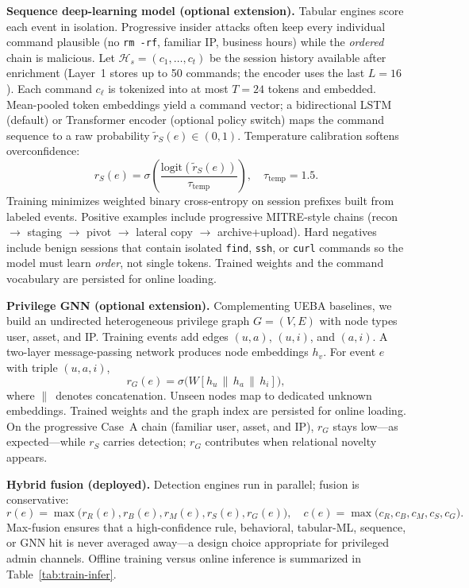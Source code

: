 \documentclass{ieeeaccess}
\begin{document}
\textbf{Sequence deep-learning model (optional extension).}
Tabular engines score each event in isolation. Progressive insider attacks often keep every individual command plausible (no \texttt{rm -rf}, familiar IP, business hours) while the \textit{ordered} chain is malicious. Let $\mathcal{H}_s=(c_1,\ldots,c_t)$ be the session history available after enrichment (Layer~1 stores up to 50 commands; the encoder uses the last $L{=}16$). Each command $c_\ell$ is tokenized into at most $T{=}24$ tokens and embedded. Mean-pooled token embeddings yield a command vector; a bidirectional LSTM (default) or Transformer encoder (optional policy switch) maps the command sequence to a raw probability $\tilde{r}_S(e)\in(0,1)$. Temperature calibration softens overconfidence:
\begin{equation}
r_S(e)=\sigma\!\left(\frac{\mathrm{logit}(\tilde{r}_S(e))}{\tau_{\mathrm{temp}}}\right),
\quad \tau_{\mathrm{temp}}=1.5.
\tag{3.4}
\end{equation}
Training minimizes weighted binary cross-entropy on session prefixes built from labeled events. Positive examples include progressive MITRE-style chains (recon $\rightarrow$ staging $\rightarrow$ pivot $\rightarrow$ lateral copy $\rightarrow$ archive+upload). Hard negatives include benign sessions that contain isolated \texttt{find}, \texttt{ssh}, or \texttt{curl} commands so the model must learn \textit{order}, not single tokens. Trained weights and the command vocabulary are persisted for online loading.

\textbf{Privilege GNN (optional extension).}
Complementing UEBA baselines, we build an undirected heterogeneous privilege graph $G=(V,E)$ with node types user, asset, and IP. Training events add edges $(u,a)$, $(u,i)$, and $(a,i)$. A two-layer message-passing network produces node embeddings $h_v$. For event $e$ with triple $(u,a,i)$,
\begin{equation}
r_G(e)=\sigma\!\bigl(W[h_u\,\|\,h_a\,\|\,h_i]\bigr),
\tag{3.5}
\end{equation}
where $\|\,$ denotes concatenation. Unseen nodes map to dedicated unknown embeddings. Trained weights and the graph index are persisted for online loading. On the progressive Case~A chain (familiar user, asset, and IP), $r_G$ stays low---as expected---while $r_S$ carries detection; $r_G$ contributes when relational novelty appears.

\textbf{Hybrid fusion (deployed).} Detection engines run in parallel; fusion is conservative:
\begin{equation}
r(e)=\max\bigl(r_R(e),r_B(e),r_M(e),r_S(e),r_G(e)\bigr), \quad
c(e)=\max\bigl(c_R,c_B,c_M,c_S,c_G\bigr).
\tag{4}
\end{equation}
Max-fusion ensures that a high-confidence rule, behavioral, tabular-ML, sequence, or GNN hit is never averaged away---a design choice appropriate for privileged admin channels. Offline training versus online inference is summarized in Table~\ref{tab:train-infer}.
\end{document}
